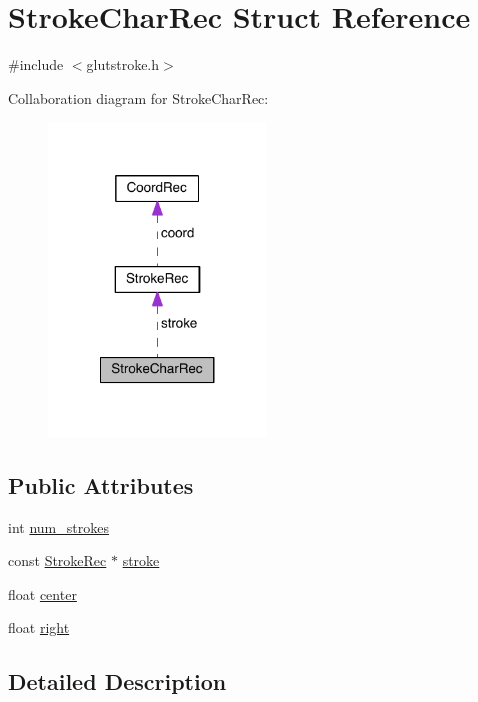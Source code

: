 \hypertarget{struct_stroke_char_rec}{\section{Stroke\-Char\-Rec Struct Reference}
\label{struct_stroke_char_rec}
}


{\ttfamily \#include $<$glutstroke.\-h$>$}



Collaboration diagram for Stroke\-Char\-Rec\-:
\nopagebreak
\begin{figure}[H]
\begin{center}
\leavevmode
\includegraphics[width=164pt]{struct_stroke_char_rec__coll__graph}
\end{center}
\end{figure}
\subsection*{Public Attributes}
\begin{DoxyCompactItemize}
\item 
int \hyperlink{struct_stroke_char_rec_a4a6ad5b0d9b44913d3b7ee7e903b0672}{num\-\_\-strokes}
\item 
const \hyperlink{struct_stroke_rec}{Stroke\-Rec} $\ast$ \hyperlink{struct_stroke_char_rec_aea565a6727bf8d994de3f44b34a01d24}{stroke}
\item 
float \hyperlink{struct_stroke_char_rec_a174a58be9841b6d0f2dad1a73d5adca6}{center}
\item 
float \hyperlink{struct_stroke_char_rec_aa6cfe683a399f3c7866cc3f01dbe2678}{right}
\end{DoxyCompactItemize}


\subsection{Detailed Description}


